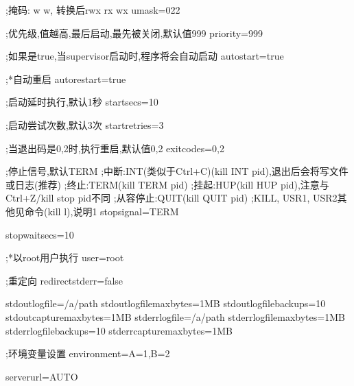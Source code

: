 \documentclass[a4paper,10pt,english]{sphinxmanual}
\begin{document}
\begin{itemize}
\begin{sphinxVerbatim}[commandchars=\\\{\}]
;掩码:\PYGZhy{}\PYGZhy{}\PYGZhy{} \PYGZhy{}w\PYGZhy{} \PYGZhy{}w\PYGZhy{}, 转换后rwx r\PYGZhy{}x w\PYGZhy{}x
umask=022

;优先级,值越高,最后启动,最先被关闭,默认值999
priority=999

;如果是true,当supervisor启动时,程序将会自动启动
autostart=true

;*自动重启
autorestart=true

;启动延时执行,默认1秒
startsecs=10

;启动尝试次数,默认3次
startretries=3

;当退出码是0,2时,执行重启,默认值0,2
exitcodes=0,2

;停止信号,默认TERM
;中断:INT(类似于Ctrl+C)(kill \PYGZhy{}INT pid),退出后会将写文件或日志(推荐)
;终止:TERM(kill \PYGZhy{}TERM pid)
;挂起:HUP(kill \PYGZhy{}HUP pid),注意与Ctrl+Z/kill \PYGZhy{}stop pid不同
;从容停止:QUIT(kill \PYGZhy{}QUIT pid)
;KILL, USR1, USR2其他见命令(kill \PYGZhy{}l),说明1
stopsignal=TERM

stopwaitsecs=10

;*以root用户执行
user=root

;重定向
redirect\PYGZus{}stderr=false

stdout\PYGZus{}logfile=/a/path
stdout\PYGZus{}logfile\PYGZus{}maxbytes=1MB
stdout\PYGZus{}logfile\PYGZus{}backups=10
stdout\PYGZus{}capture\PYGZus{}maxbytes=1MB
stderr\PYGZus{}logfile=/a/path
stderr\PYGZus{}logfile\PYGZus{}maxbytes=1MB
stderr\PYGZus{}logfile\PYGZus{}backups=10
stderr\PYGZus{}capture\PYGZus{}maxbytes=1MB

;环境变量设置
environment=A=\PYGZdq{}1\PYGZdq{},B=\PYGZdq{}2\PYGZdq{}

serverurl=AUTO


\end{sphinxVerbatim}
\end{itemize}
\end{document}
